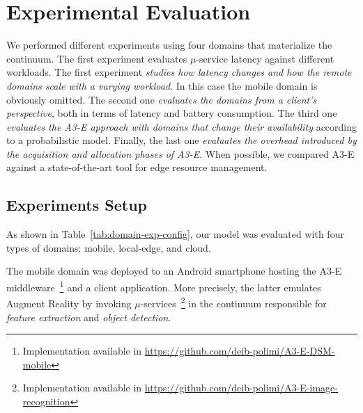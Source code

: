 
\section{Experimental Evaluation}\label{sec:evaluation}

We performed different experiments using four domains that materialize the continuum. The first experiment evaluates $\mu$-service latency against different workloads. The first experiment \emph{studies how latency changes and how the remote domains scale with a varying workload}. In this case the mobile domain is obviously omitted. The second one \emph{evaluates the domains from a client's perspective}, both in terms of latency and battery consumption. The third one \emph{evaluates the A3-E approach with domains that change their availability} according to a probabilistic model. Finally, the last one \emph{evaluates the overhead introduced by the acquisition and allocation phases of A3-E}. When possible, we compared A3-E against a state-of-the-art tool for edge resource management.

\subsection{Experiments Setup}


As shown in Table~\ref{tab:domain-exp-config}, our model was evaluated with four types of domains: mobile, local-edge, and cloud. 

The mobile domain was deployed to an Android smartphone hosting the A3-E middleware~\footnote{Implementation available in \url{https://github.com/deib-polimi/A3-E-DSM-mobile}} and a client application. More precisely, the latter emulates Augment Reality by invoking
$\mu$-services~\footnote{Implementation available in \url{https://github.com/deib-polimi/A3-E-image-recognition}} in the continuum responsible for \textit{feature extraction} and \textit{object detection}. 

